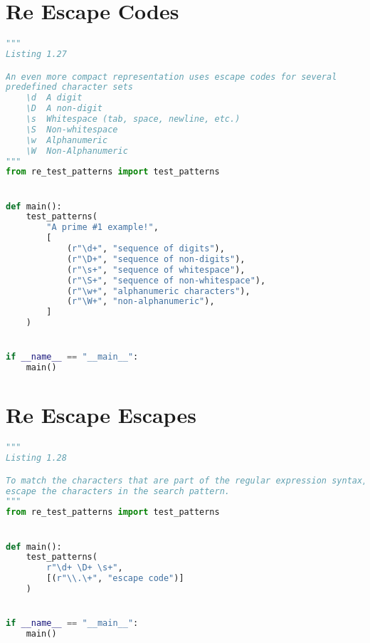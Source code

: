 \documentclass[a4paper,landscape]{report}
\begin{document}
\section{Re Escape Codes}
\begin{lstlisting}[language=Python]
"""
Listing 1.27

An even more compact representation uses escape codes for several
predefined character sets
    \d  A digit
    \D  A non-digit
    \s  Whitespace (tab, space, newline, etc.)
    \S  Non-whitespace
    \w  Alphanumeric
    \W  Non-Alphanumeric
"""
from re_test_patterns import test_patterns


def main():
    test_patterns(
        "A prime #1 example!",
        [
            (r"\d+", "sequence of digits"),
            (r"\D+", "sequence of non-digits"),
            (r"\s+", "sequence of whitespace"),
            (r"\S+", "sequence of non-whitespace"),
            (r"\w+", "alphanumeric characters"),
            (r"\W+", "non-alphanumeric"),
        ]
    )


if __name__ == "__main__":
    main()

\end{lstlisting}
\section{Re Escape Escapes}
\begin{lstlisting}[language=Python]
"""
Listing 1.28

To match the characters that are part of the regular expression syntax,
escape the characters in the search pattern.
"""
from re_test_patterns import test_patterns


def main():
    test_patterns(
        r"\d+ \D+ \s+",
        [(r"\\.\+", "escape code")]
    )


if __name__ == "__main__":
    main()

\end{lstlisting}
\end{document}
